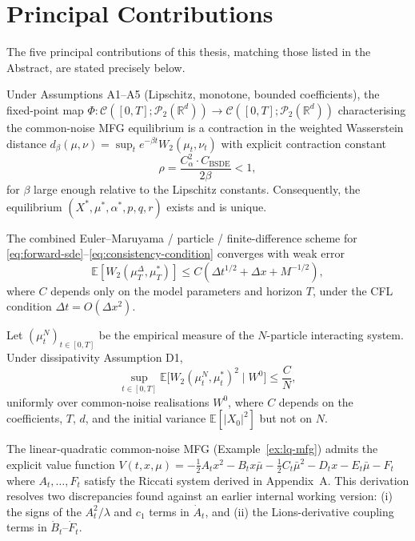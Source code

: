\section{Principal Contributions}

The five principal contributions of this thesis, matching those listed in the
Abstract, are stated precisely below.

\begin{theorem}
\label{thm:intro-wellposedness}
Under Assumptions A1--A5 (Lipschitz, monotone, bounded coefficients), the
fixed-point map $\Phi: \mathcal{C}([0,T]; \mathcal{P}_2(\mathbb{R}^d)) \to
\mathcal{C}([0,T]; \mathcal{P}_2(\mathbb{R}^d))$ characterising the common-noise
MFG equilibrium is a contraction in the weighted Wasserstein distance
$d_\beta(\mu, \nu) = \sup_t e^{-\beta t} W_2(\mu_t, \nu_t)$ with explicit
contraction constant
\[
    \rho = \frac{C_\alpha^2 \cdot C_{\mathrm{BSDE}}}{2\beta} < 1,
\]
for $\beta$ large enough relative to the Lipschitz constants. Consequently, the
equilibrium $(X^*, \mu^*, \alpha^*, p, q, r)$ exists and is unique.
\end{theorem}

\begin{theorem}
\label{thm:intro-numerical}
The combined Euler--Maruyama / particle / finite-difference scheme for
\eqref{eq:forward-sde}--\eqref{eq:consistency-condition} converges with weak error
\[
    \mathbb{E}[W_2(\mu_T^\Delta, \mu_T^*)] \le C\left(\Delta t^{1/2} + \Delta x
    + M^{-1/2}\right),
\]
where $C$ depends only on the model parameters and horizon $T$, under the CFL
condition $\Delta t = O(\Delta x^2)$.
\end{theorem}

\begin{theorem}
\label{thm:intro-chaos}
Let $(\mu_t^N)_{t \in [0,T]}$ be the empirical measure of the $N$-particle
interacting system. Under dissipativity Assumption D1,
\[
    \sup_{t \in [0,T]} \mathbb{E}\big[W_2(\mu_t^N, \mu_t^*)^2 \mid W^0\big]
    \le \frac{C}{N},
\]
uniformly over common-noise realisations $W^0$, where $C$ depends on the
coefficients, $T$, $d$, and the initial variance $\mathbb{E}[|X_0|^2]$ but not on $N$.
\end{theorem}

\begin{proposition}
The linear-quadratic common-noise MFG (Example~\ref{ex:lq-mfg}) admits the
explicit value function $V(t,x,\mu) = -\tfrac12 A_t x^2 - B_t x\bar\mu
- \tfrac12 C_t \bar\mu^2 - D_t x - E_t\bar\mu - F_t$ where $A_t, \ldots, F_t$
satisfy the Riccati system derived in Appendix~A. This derivation resolves
two discrepancies found against an earlier internal working version: (i) the
signs of the $A_t^2/\lambda$ and $c_1$ terms in $\dot{A}_t$, and (ii) the
Lions-derivative coupling terms in $\dot{B}_t$--$\dot{F}_t$.
\end{proposition}

